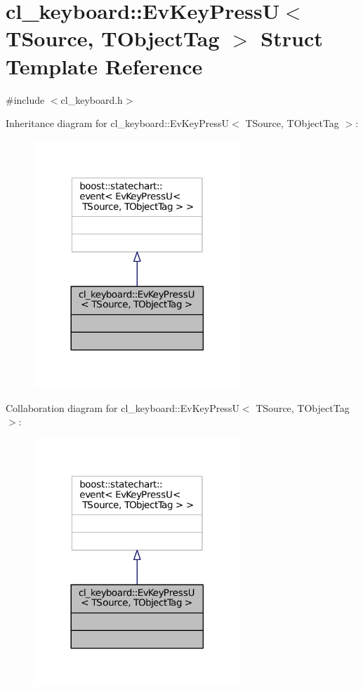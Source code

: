 \hypertarget{structcl__keyboard_1_1EvKeyPressU}{}\section{cl\+\_\+keyboard\+:\+:Ev\+Key\+PressU$<$ T\+Source, T\+Object\+Tag $>$ Struct Template Reference}
\label{structcl__keyboard_1_1EvKeyPressU}


{\ttfamily \#include $<$cl\+\_\+keyboard.\+h$>$}



Inheritance diagram for cl\+\_\+keyboard\+:\+:Ev\+Key\+PressU$<$ T\+Source, T\+Object\+Tag $>$\+:
\nopagebreak
\begin{figure}[H]
\begin{center}
\leavevmode
\includegraphics[width=221pt]{structcl__keyboard_1_1EvKeyPressU__inherit__graph}
\end{center}
\end{figure}


Collaboration diagram for cl\+\_\+keyboard\+:\+:Ev\+Key\+PressU$<$ T\+Source, T\+Object\+Tag $>$\+:
\nopagebreak
\begin{figure}[H]
\begin{center}
\leavevmode
\includegraphics[width=221pt]{structcl__keyboard_1_1EvKeyPressU__coll__graph}
\end{center}
\end{figure}


